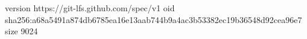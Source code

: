 version https://git-lfs.github.com/spec/v1
oid sha256:a68a5491a874db6785ea16e13aab744b9a4ac3b53382ec19b36548d92cea96e7
size 9024
